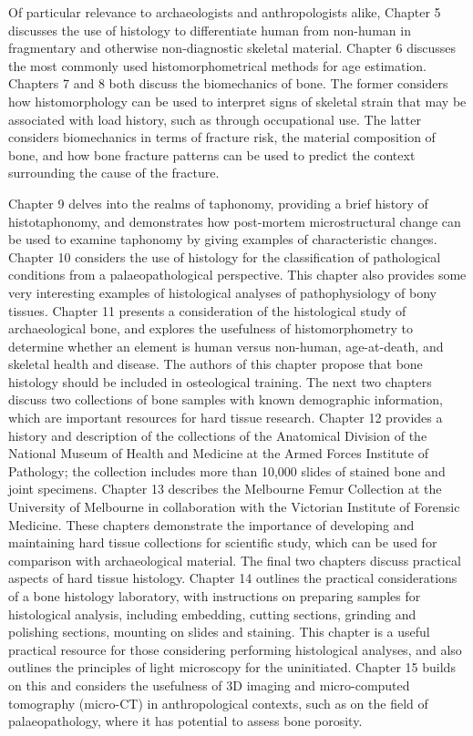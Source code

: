 Of particular relevance to archaeologists and anthropologists alike, Chapter 5 discusses the use of histology to differentiate human from non-human in fragmentary and otherwise non-diagnostic skeletal material. Chapter 6 discusses the most commonly used histomorphometrical methods for age estimation. Chapters 7 and 8 both discuss the biomechanics of bone. The former considers how histomorphology can be used to interpret signs of skeletal strain that may be associated with load history, such as through occupational use.  The latter considers biomechanics in terms of fracture risk, the material composition of bone, and how bone fracture patterns can be used to predict the context surrounding the cause of the fracture.

Chapter 9 delves into the realms of taphonomy, providing a brief history of histotaphonomy, and demonstrates how post-mortem microstructural change can be used to examine taphonomy by giving examples of characteristic changes. Chapter 10 considers the use of histology for the classification of pathological conditions from a palaeopathological perspective. This chapter also provides some very interesting examples of histological analyses of pathophysiology of bony tissues. Chapter 11 presents a consideration of the histological study of archaeological bone, and explores the usefulness of histomorphometry to determine whether an element is human versus non-human, age-at-death, and skeletal health and disease. The authors of this chapter propose that bone histology should be included in osteological training. 
The next two chapters discuss two collections of bone samples with known demographic information, which are important resources for hard tissue research. Chapter 12 provides a history and description of the collections of the Anatomical Division of the National Museum of Health and Medicine at the Armed Forces Institute of Pathology; the collection includes more than 10,000 slides of stained bone and joint specimens. Chapter 13 describes the Melbourne Femur Collection at the University of Melbourne in collaboration with the Victorian Institute of Forensic Medicine. These chapters demonstrate the importance of developing and maintaining hard tissue collections for scientific study, which can be used for comparison with archaeological material.
The final two chapters discuss practical aspects of hard tissue histology. Chapter 14 outlines the practical considerations of a bone histology laboratory, with instructions on preparing samples for histological analysis, including embedding, cutting sections, grinding and polishing sections, mounting on slides and staining. This chapter is a useful practical resource for those considering performing histological analyses, and also outlines the principles of light microscopy for the uninitiated. Chapter 15 builds on this and considers the usefulness of 3D imaging and micro-computed tomography (micro-CT) in anthropological contexts, such as on the field of palaeopathology, where it has potential to assess bone porosity. 

